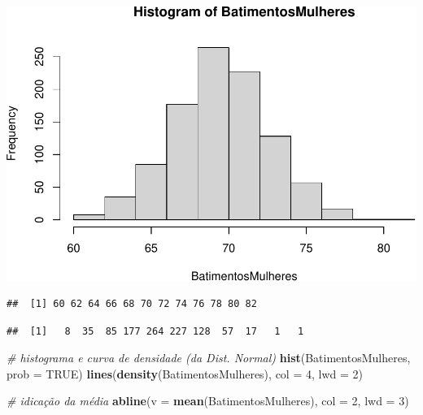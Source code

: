 \documentclass[
]{book}
\newenvironment{Shaded}{\begin{snugshade}}{\end{snugshade}}
\newcommand{\AttributeTok}[1]{\textcolor[rgb]{0.13,0.29,0.53}{#1}}
\newcommand{\CommentTok}[1]{\textcolor[rgb]{0.56,0.35,0.01}{\textit{#1}}}
\newcommand{\ConstantTok}[1]{\textcolor[rgb]{0.56,0.35,0.01}{#1}}
\newcommand{\DecValTok}[1]{\textcolor[rgb]{0.00,0.00,0.81}{#1}}
\newcommand{\FunctionTok}[1]{\textcolor[rgb]{0.13,0.29,0.53}{\textbf{#1}}}
\newcommand{\NormalTok}[1]{#1}
\newcommand{\SpecialCharTok}[1]{\textcolor[rgb]{0.81,0.36,0.00}{\textbf{#1}}}
\begin{document}
\includegraphics{Livro-Estatistica+R_files/figure-latex/unnamed-chunk-23-1.pdf}

\begin{Shaded}
\end{Shaded}

\begin{verbatim}
##  [1] 60 62 64 66 68 70 72 74 76 78 80 82
\end{verbatim}

\begin{Shaded}
\end{Shaded}

\begin{verbatim}
##  [1]   8  35  85 177 264 227 128  57  17   1   1
\end{verbatim}

\begin{Shaded}
\begin{Highlighting}[]
\CommentTok{\# histograma e curva de densidade (da Dist. Normal)}
\FunctionTok{hist}\NormalTok{(BatimentosMulheres, }\AttributeTok{prob =} \ConstantTok{TRUE}\NormalTok{)}
\FunctionTok{lines}\NormalTok{(}\FunctionTok{density}\NormalTok{(BatimentosMulheres), }\AttributeTok{col =} \DecValTok{4}\NormalTok{, }\AttributeTok{lwd =} \DecValTok{2}\NormalTok{)}

\CommentTok{\# idicação da média}
\FunctionTok{abline}\NormalTok{(}\AttributeTok{v =} \FunctionTok{mean}\NormalTok{(BatimentosMulheres), }\AttributeTok{col =} \DecValTok{2}\NormalTok{, }\AttributeTok{lwd =} \DecValTok{3}\NormalTok{)}
\end{Highlighting}
\end{Shaded}
\end{document}

